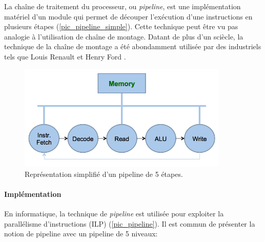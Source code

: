 La chaîne de traitement du processeur, ou \textit{pipeline}, est une implémentation matériel d'un module qui permet de découper l'exécution d'une instructions en plusieurs étapes (\autoref{pic_pipeline_simple}). Cette technique peut être vu pas analogie à l'utilisation de chaîne de montage. Datant de plus d'un sciècle, la technique de la chaîne de montage a été abondamment utilisée par des industriels tels que Louis Renault et Henry Ford \cite{wolff1957entrepreneurs}.



\begin{figure}
    \center
    \includegraphics[width=10cm]{images/Chapitre1/Neumann.png}
    \caption{\label{pic_pipeline_simple} Représentation simplifié d'un pipeline de 5 étapes.}
\end{figure}


\paragraph{Implémentation}

En informatique, la technique de \textit{pipeline} est utilisée pour exploiter la parallélisme d'instructions (ILP) (\autoref{pic_pipeline}). Il est commun de présenter la notion de pipeline avec un pipeline de 5 niveaux:

